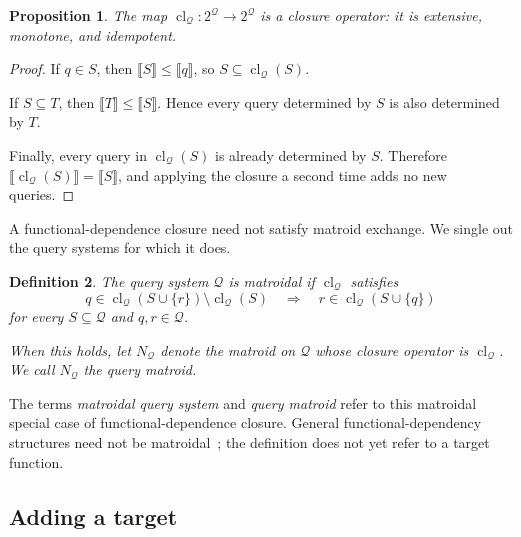 \documentclass[11pt]{article}
\numberwithin{equation}{section}
\newtheorem{definition}{Definition}[section]
\newtheorem{proposition}[definition]{Proposition}
\theoremstyle{remark}
\begin{document}
\begin{proposition}
\label{prop:query-closure-operator}
The map
$\operatorname{cl}_{\mathcal Q}:2^{\mathcal Q}\to2^{\mathcal Q}$
is a closure operator: it is extensive, monotone, and idempotent.
\end{proposition}

\begin{proof}
If $q\in S$, then $\llbracket S\rrbracket\leq\llbracket q\rrbracket$, so
$S\subseteq\operatorname{cl}_{\mathcal Q}(S)$.

If $S\subseteq T$, then
$\llbracket T\rrbracket\leq\llbracket S\rrbracket$. Hence every query
determined by $S$ is also determined by $T$.

Finally, every query in $\operatorname{cl}_{\mathcal Q}(S)$ is already
determined by $S$. Therefore
$\llbracket\operatorname{cl}_{\mathcal Q}(S)\rrbracket
=\llbracket S\rrbracket$, and applying the closure a second time adds no new
queries.
\end{proof}

A functional-dependence closure need not satisfy matroid exchange. We single out the query systems for which it does.

\begin{definition}
\label{def:matroidal-query-system}
The query system $\mathcal Q$ is \emph{matroidal} if
$\operatorname{cl}_{\mathcal Q}$ satisfies
\begin{equation}
    q\in
    \operatorname{cl}_{\mathcal Q}(S\cup\{r\})
    \setminus
    \operatorname{cl}_{\mathcal Q}(S)
    \quad\Longrightarrow\quad
    r\in\operatorname{cl}_{\mathcal Q}(S\cup\{q\})
\end{equation}
for every $S\subseteq\mathcal Q$ and $q,r\in\mathcal Q$.

When this holds, let $N_{\mathcal Q}$ denote the matroid on
$\mathcal Q$ whose closure operator is
$\operatorname{cl}_{\mathcal Q}$. We call $N_{\mathcal Q}$ the
\emph{query matroid}.
\end{definition}

The terms \emph{matroidal query system} and \emph{query matroid} refer to
this matroidal special case of functional-dependence closure. General
functional-dependency structures need not be matroidal~\cite{Matus1991}; the
definition does not yet refer to a target function.

\subsection{Adding a target}
\label{subsec:target-query-matroid}
\end{document}
